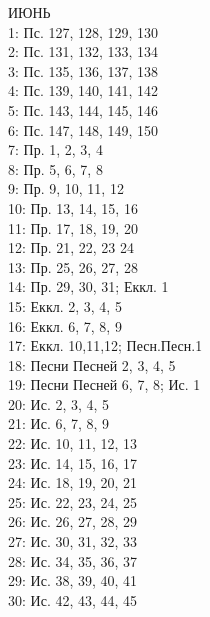 \documentclass[fontsize=16pt,letterpaper,DIV=6]{scrartcl}
\begin{document}
\begin{multicols}{2}
ИЮНЬ
\\  1: Пс. 127, 128, 129, 130
\\  2: Пс. 131, 132, 133, 134
\\  3: Пс. 135, 136, 137, 138
\\  4: Пс. 139, 140, 141, 142
\\  5: Пс. 143, 144, 145, 146
\\  6: Пс. 147, 148, 149, 150
\\  7: Пр. 1, 2, 3, 4
\\  8: Пр. 5, 6, 7, 8
\\  9: Пр. 9, 10, 11, 12
\\  10: Пр. 13, 14, 15, 16
\\  11: Пр. 17, 18, 19, 20
\\  12: Пр. 21, 22, 23 24
\\  13: Пр. 25, 26, 27, 28
\\  14: Пр. 29, 30, 31; Еккл. 1
\\  15: Еккл. 2, 3, 4, 5
\\  16: Еккл. 6, 7, 8, 9
\\  17: Еккл. 10,11,12; Песн.Песн.1
\\  18: Песни Песней 2, 3, 4, 5
\\  19: Песни Песней 6, 7, 8; Ис. 1
\\  20: Ис. 2, 3, 4, 5
\\  21: Ис. 6, 7, 8, 9
\\  22: Ис. 10, 11, 12, 13
\\  23: Ис. 14, 15, 16, 17
\\  24: Ис. 18, 19, 20, 21
\\  25: Ис. 22, 23, 24, 25
\\  26: Ис. 26, 27, 28, 29
\\  27: Ис. 30, 31, 32, 33
\\  28: Ис. 34, 35, 36, 37
\\  29: Ис. 38, 39, 40, 41
\\  30: Ис. 42, 43, 44, 45

\end{multicols}
\clearpage
\end{document}
